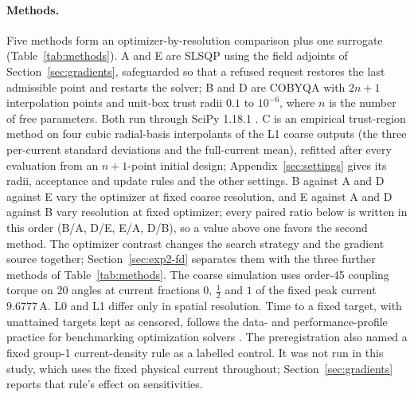 \paragraph{Methods.}
Five methods form an optimizer-by-resolution comparison plus one
surrogate (Table~\ref{tab:methods}). A and E are SLSQP
\citep{kraft1988} using the field adjoints of Section~\ref{sec:gradients},
safeguarded so that a refused request restores the last admissible point
and restarts the solver; B and D are COBYQA \citep{ragonneau2022} with $2n+1$ interpolation points
and unit-box trust radii $0.1$ to $10^{-6}$, where $n$ is the number of free
parameters. Both run through SciPy 1.18.1 \citep{virtanen2020scipy}. C is
an empirical trust-region method on four cubic radial-basis interpolants
of the L1 coarse outputs (the three per-current standard deviations and
the full-current mean), refitted after every evaluation from an $n+1$-point
initial design; Appendix~\ref{sec:settings} gives its radii, acceptance
and update rules and the other settings. B against A and D against E vary
the optimizer at fixed coarse resolution, and E against A and D against B
vary resolution at fixed optimizer; every paired ratio below is written in
this order (B/A, D/E, E/A, D/B), so a value above one favors the second
method. The optimizer contrast
changes the search strategy and the gradient source together;
Section~\ref{sec:exp2-fd} separates them with the three further methods of
Table~\ref{tab:methods}. The coarse simulation uses order-45 coupling torque
on 20 angles at current fractions $0$, $\tfrac12$ and $1$ of the fixed peak
current $9.6777\,\mathrm{A}$. L0 and L1 differ only in spatial resolution.
Time to a fixed
target, with unattained targets kept as censored, follows the data- and performance-profile
practice for benchmarking optimization solvers \citep{more2009benchmarking,dolan2002benchmarking}.
The preregistration also named a fixed group-1 current-density rule as a
labelled control. It was not run in this study, which uses the fixed
physical current throughout; Section~\ref{sec:gradients} reports that
rule's effect on sensitivities.

